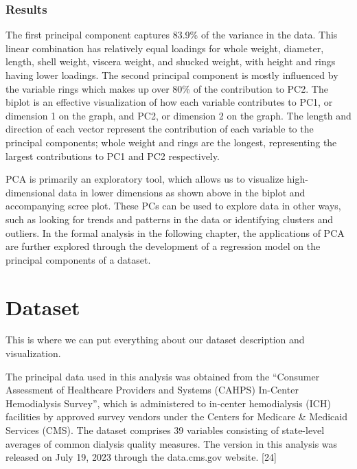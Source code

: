 \documentclass[
  letterpaper,
  DIV=11,
  numbers=noendperiod]{scrreprt}
\begin{document}
\hypertarget{results-1}{%
\subsection{Results}\label{results-1}}

The first principal component captures 83.9\% of the variance in the
data. This linear combination has relatively equal loadings for whole
weight, diameter, length, shell weight, viscera weight, and shucked
weight, with height and rings having lower loadings. The second
principal component is mostly influenced by the variable rings which
makes up over 80\% of the contribution to PC2. The biplot is an
effective visualization of how each variable contributes to PC1, or
dimension 1 on the graph, and PC2, or dimension 2 on the graph. The
length and direction of each vector represent the contribution of each
variable to the principal components; whole weight and rings are the
longest, representing the largest contributions to PC1 and PC2
respectively.

PCA is primarily an exploratory tool, which allows us to visualize
high-dimensional data in lower dimensions as shown above in the biplot
and accompanying scree plot. These PCs can be used to explore data in
other ways, such as looking for trends and patterns in the data or
identifying clusters and outliers. In the formal analysis in the
following chapter, the applications of PCA are further explored through
the development of a regression model on the principal components of a
dataset.


\hypertarget{dataset}{%
\chapter{Dataset}\label{dataset}}

This is where we can put everything about our dataset description and
visualization.

The principal data used in this analysis was obtained from the
``Consumer Assessment of Healthcare Providers and Systems (CAHPS)
In-Center Hemodialysis Survey'', which is administered to in-center
hemodialysis (ICH) facilities by approved survey vendors under the
Centers for Medicare \& Medicaid Services (CMS). The dataset comprises
39 variables consisting of state-level averages of common dialysis
quality measures. The version in this analysis was released on July 19,
2023 through the data.cms.gov website. {[}24{]}
\end{document}
